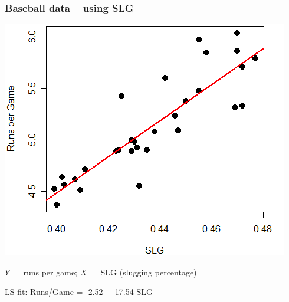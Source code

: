 \documentclass{beamer}
\begin{document}
\begin{frame}
\frametitle{Baseball data -- using SLG} 

\vspace{-5.8mm}
\begin{center}
\includegraphics[scale=0.42]{figures/SlgR.png}
\end{center}

\vspace{-5.8mm}
$Y=$ runs per game; $X=$ SLG (slugging percentage)

\vspace{1mm}
LS fit: {\color{red} Runs/Game = -2.52 + 17.54 SLG}
\end{frame}
\end{document}
